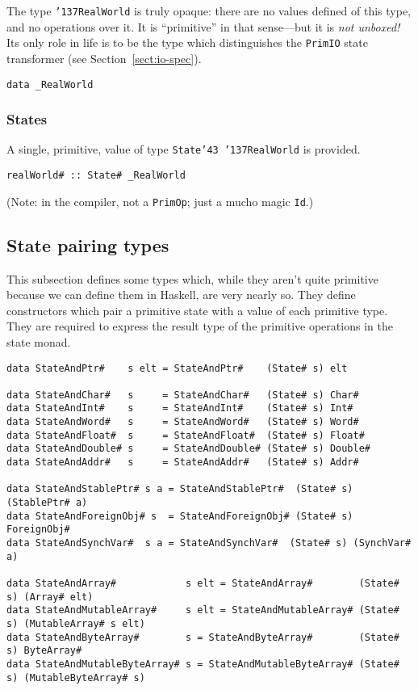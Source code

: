 The type \mbox{\tt {\char'137}RealWorld} is truly opaque: there are no values defined
of this type, and no operations over it.  It is ``primitive'' in that
sense---but it is {\em not unboxed!} Its only role in life is to be the type
which distinguishes the \mbox{\tt PrimIO} state transformer (see
Section~\ref{sect:io-spec}).
\begin{verbatim}
data _RealWorld
\end{verbatim}

\subsubsection{States}

A single, primitive, value of type \mbox{\tt State{\char'43}\ {\char'137}RealWorld} is provided.
\begin{verbatim}
realWorld# :: State# _RealWorld
\end{verbatim}
(Note: in the compiler, not a \mbox{\tt PrimOp}; just a mucho magic \mbox{\tt Id}.)

\subsection{State pairing types}
\label{sect:horrid-pairing-types}

This subsection defines some types which, while they aren't quite primitive 
because we can define them in Haskell, are very nearly so.  They define 
constructors which pair a primitive state with a value of each primitive type.
They are required to express the result type of the primitive operations in the 
state monad.
\begin{verbatim}
data StateAndPtr#    s elt = StateAndPtr#    (State# s) elt 

data StateAndChar#   s     = StateAndChar#   (State# s) Char# 
data StateAndInt#    s     = StateAndInt#    (State# s) Int# 
data StateAndWord#   s     = StateAndWord#   (State# s) Word#
data StateAndFloat#  s     = StateAndFloat#  (State# s) Float# 
data StateAndDouble# s     = StateAndDouble# (State# s) Double#  
data StateAndAddr#   s     = StateAndAddr#   (State# s) Addr#

data StateAndStablePtr# s a = StateAndStablePtr#  (State# s) (StablePtr# a)
data StateAndForeignObj# s  = StateAndForeignObj# (State# s) ForeignObj#
data StateAndSynchVar#  s a = StateAndSynchVar#  (State# s) (SynchVar# a)

data StateAndArray#            s elt = StateAndArray#        (State# s) (Array# elt) 
data StateAndMutableArray#     s elt = StateAndMutableArray# (State# s) (MutableArray# s elt)  
data StateAndByteArray#        s = StateAndByteArray#        (State# s) ByteArray# 
data StateAndMutableByteArray# s = StateAndMutableByteArray# (State# s) (MutableByteArray# s)
\end{verbatim}



